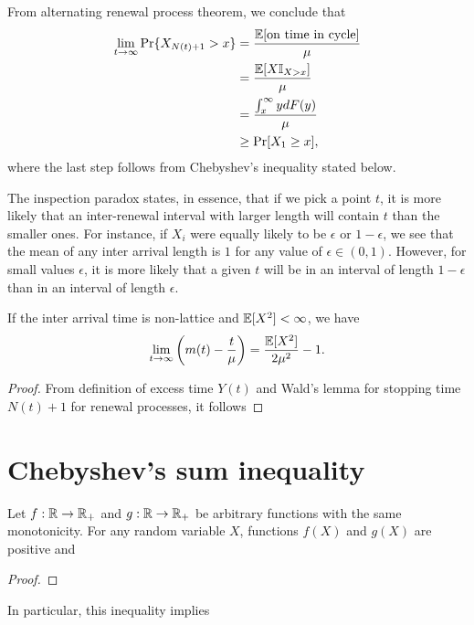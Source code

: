 \documentclass[a4paper,10pt,english]{article}
\begin{document}
From alternating renewal process theorem, we conclude that 
\begin{align*}
\lim_{t\to \infty}\Pr\{X_{N(t)+1}>x\} &= \frac{\mathbb{E}[\text{on time in cycle}]}{\mu} \\
&= \frac{\mathbb{E}[X\mathbb{I}_{X>x}]}{\mu}\\
&= \frac{\int_{x}^\infty y dF(y)}{\mu}\\
&\geq \Pr[X_1\geq x],
\end{align*}
where the last step follows from Chebyshev's inequality stated below.

The inspection paradox states, in essence, that if we pick a point $t$, it is more likely that an inter-renewal interval with larger length will contain $t$ than the smaller ones. 
For instance, if $X_i$ were equally likely to be $\epsilon$ or $1-\epsilon$, we see that the mean of any inter arrival length is $1$ for any value of $\epsilon\in(0,1)$. 
However, for small values $\epsilon$, it is more likely that a given $t$ will be in an interval of length $1-\epsilon$ than in an interval of length $\epsilon$.


\begin{prop}
If the inter arrival time is non-lattice and $\mathbb{E}[X^2] < \infty$, we have 
\begin{align*}
\lim_{t \to \infty} \left(m(t)-\frac{t}{\mu}\right) = \frac{\mathbb{E}[X^2]}{2\mu^2}-1.
\end{align*} 
\begin{proof}
From definition of excess time $Y(t)$ and Wald's lemma for stopping time $N(t)+1$ for renewal processes, it follows  
\end{proof}

\end{prop}

\appendix

\section{Chebyshev's sum inequality}
\begin{lem}
Let $f:\mathbb{R} \to \mathbb{R}_{+}$ and $g : \mathbb{R} \to \mathbb{R}_{+}$ be arbitrary functions with the same monotonicity.  
For any random variable $X$, functions $f(X)$ and $g(X)$ are positive and
\end{lem}
\begin{proof}
\end{proof} 
In particular, this inequality implies
\end{document}
